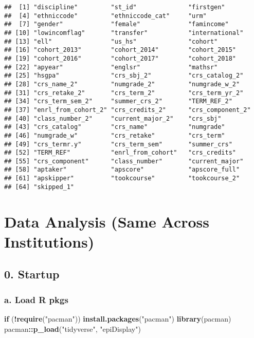 \documentclass[]{article}
\newenvironment{Shaded}{\begin{snugshade}}{\end{snugshade}}
\newcommand{\KeywordTok}[1]{\textcolor[rgb]{0.13,0.29,0.53}{\textbf{#1}}}
\newcommand{\StringTok}[1]{\textcolor[rgb]{0.31,0.60,0.02}{#1}}
\newcommand{\ControlFlowTok}[1]{\textcolor[rgb]{0.13,0.29,0.53}{\textbf{#1}}}
\newcommand{\OperatorTok}[1]{\textcolor[rgb]{0.81,0.36,0.00}{\textbf{#1}}}
\newcommand{\NormalTok}[1]{#1}
\begin{document}
\begin{verbatim}
##  [1] "discipline"         "st_id"              "firstgen"          
##  [4] "ethniccode"         "ethniccode_cat"     "urm"               
##  [7] "gender"             "female"             "famincome"         
## [10] "lowincomflag"       "transfer"           "international"     
## [13] "ell"                "us_hs"              "cohort"            
## [16] "cohort_2013"        "cohort_2014"        "cohort_2015"       
## [19] "cohort_2016"        "cohort_2017"        "cohort_2018"       
## [22] "apyear"             "englsr"             "mathsr"            
## [25] "hsgpa"              "crs_sbj_2"          "crs_catalog_2"     
## [28] "crs_name_2"         "numgrade_2"         "numgrade_w_2"      
## [31] "crs_retake_2"       "crs_term_2"         "crs_term_yr_2"     
## [34] "crs_term_sem_2"     "summer_crs_2"       "TERM_REF_2"        
## [37] "enrl_from_cohort_2" "crs_credits_2"      "crs_component_2"   
## [40] "class_number_2"     "current_major_2"    "crs_sbj"           
## [43] "crs_catalog"        "crs_name"           "numgrade"          
## [46] "numgrade_w"         "crs_retake"         "crs_term"          
## [49] "crs_termr.y"        "crs_term_sem"       "summer_crs"        
## [52] "TERM_REF"           "enrl_from_cohort"   "crs_credits"       
## [55] "crs_component"      "class_number"       "current_major"     
## [58] "aptaker"            "apscore"            "apscore_full"      
## [61] "apskipper"          "tookcourse"         "tookcourse_2"      
## [64] "skipped_1"
\end{verbatim}

\section{\texorpdfstring{\textbf{Data Analysis (Same Across
Institutions)}}{Data Analysis (Same Across Institutions)}}\label{data-analysis-same-across-institutions}

\subsection{0. Startup}\label{startup-1}

\subsubsection{a. Load R pkgs}\label{a.-load-r-pkgs-1}

\begin{Shaded}
\begin{Highlighting}[]
\ControlFlowTok{if}\NormalTok{ (}\OperatorTok{!}\KeywordTok{require}\NormalTok{(}\StringTok{"pacman"}\NormalTok{)) }\KeywordTok{install.packages}\NormalTok{(}\StringTok{"pacman"}\NormalTok{)}
\KeywordTok{library}\NormalTok{(pacman)}
\NormalTok{pacman}\OperatorTok{::}\KeywordTok{p_load}\NormalTok{(}\StringTok{"tidyverse"}\NormalTok{, }\StringTok{"epiDisplay"}\NormalTok{)}
\end{Highlighting}
\end{Shaded}
\end{document}
